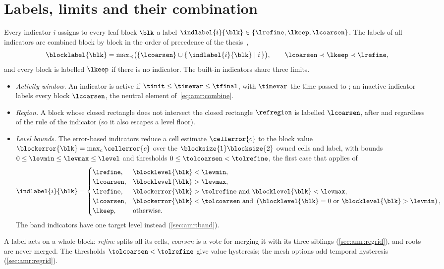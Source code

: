 \section{Labels, limits and their combination}\label{sec:amr:labels}
Every indicator $i$ assigns to every leaf block $\blk$ a label
$\indlabel{i}{\blk}\in\{\lrefine,\lkeep,\lcoarsen\}$. The labels of all
indicators are combined block by block in the order of precedence of the
thesis~,
\begin{equation}\label{eq:amr:combine}
  \blocklabel{\blk}=\max\nolimits_{\prec}\bigl(\{\lcoarsen\}\cup\set{\indlabel{i}{\blk}}{i}\bigr),
  \qquad \lcoarsen\prec\lkeep\prec\lrefine,
\end{equation}
and every block is labelled $\lkeep$ if there is no indicator. The built-in
indicators share three limits.
\begin{itemize}
\item \emph{Activity window.} An indicator is active if
  $\tinit\le\timevar\le\tfinal$, with $\timevar$ the time passed to
  ; an inactive indicator labels every block $\lcoarsen$, the
  neutral element of~\cref{eq:amr:combine}.
\item \emph{Region.} A block whose closed rectangle does not intersect the
  closed rectangle $\refregion$ is labelled $\lcoarsen$, after and regardless
  of the rule of the indicator (so it also escapes a level floor).
\item \emph{Level bounds.} The error-based indicators reduce a cell estimate
  $\cellerror{c}$ to the block value
  $\blockerror{\blk}=\max_{c}\cellerror{c}$ over the
  $\blocksize{1}\blocksize{2}$ owned cells and label, with bounds
  $0\le\levmin\le\levmax\le\level$ and thresholds
  $0\le\tolcoarsen<\tolrefine$, the first case that applies of
  \begin{equation}\label{eq:amr:error-labels}
    \indlabel{i}{\blk}=\begin{cases}
      \lrefine, & \blocklevel{\blk}<\levmin,\\
      \lcoarsen, & \blocklevel{\blk}>\levmax,\\
      \lrefine, & \blockerror{\blk}>\tolrefine\ \text{and}\ \blocklevel{\blk}<\levmax,\\
      \lcoarsen, & \blockerror{\blk}<\tolcoarsen\ \text{and}\ \roundpar{\blocklevel{\blk}=0\ \text{or}\ \blocklevel{\blk}>\levmin},\\
      \lkeep, & \text{otherwise}.
    \end{cases}
  \end{equation}
  The band indicators have one target level instead (\cref{sec:amr:band}).
\end{itemize}
A label acts on a whole block: \emph{refine} splits all its cells,
\emph{coarsen} is a vote for merging it with its three siblings
(\cref{sec:amr:regrid}), and roots are never merged. The thresholds
$\tolcoarsen<\tolrefine$ give value hysteresis; the mesh options add
temporal hysteresis (\cref{sec:amr:regrid}).

